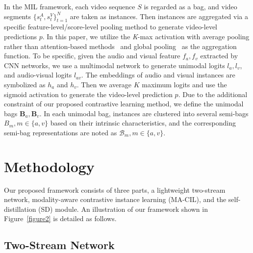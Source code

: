 \documentclass[sigconf]{acmart}
\begin{document}
In the MIL framework, each video sequence $S$ is regarded as a bag, and video segments $\{s_t^A, s_t^V\}_{t=1}^N$ are taken as instances. Then instances are aggregated via a specific feature-level/score-level pooling method to generate video-level predictions $p$. In this paper, we utilize the \textit{K}-max activation with average pooling rather than attention-based methods~\cite{nguyen2018weakly, tian2020unified} and global pooling~\cite{zhang2019temporal, sultani2018real} as the aggregation function. To be specific, given the audio and visual feature $f_a, f_v$ extracted by CNN networks, we use a multimodal network to generate unimodal logits $l_{a}, l_{v}$, and audio-visual logits $l_{av}$. The embeddings of audio and visual instances are symbolized as $h_a$ and $h_v$. Then we average $K$ maximum logits and use the sigmoid activation to generate the video-level prediction $p$. Due to the additional constraint of our proposed contrastive learning method, we define the unimodal bags $\mathbf{B}_a, \mathbf{B}_v$. In each unimodal bag, instances are clustered into several semi-bags $B_m, m\in \{a, v\}$ based on their intrinsic characteristics, and the corresponding semi-bag representations are noted as $\mathcal{B}_m, m\in \{a, v\}$.

\section{Methodology}

Our proposed framework consists of three parts, a lightweight two-stream network, modality-aware contrastive instance learning (MA-CIL), and the self-distillation (SD) module. An illustration of our framework shown in Figure~\ref{figure2} is detailed as follows. 

\subsection{Two-Stream Network}
\end{document}
